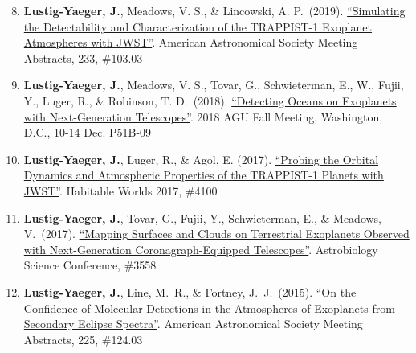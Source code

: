 \documentclass[margin,10pt]{res}
\newenvironment{benumerate}[1]{
    \let\oldItem\item
    \def\item{\addtocounter{enumi}{-2}\oldItem}
    \begin{enumerate}
    \setcounter{enumi}{#1}
    \addtocounter{enumi}{1}
}{
    \end{enumerate}
}
\begin{document}
\begin{resume}
\begin{benumerate}{7}
                    \item \textbf{Lustig-Yaeger, J.}, Meadows, V. S., \& Lincowski, A. P.\ (2019). \href{http://adsabs.harvard.edu/abs/2019AAS...23310303L}{``Simulating the Detectability and Characterization of the TRAPPIST-1 Exoplanet Atmospheres with JWST''}. American Astronomical Society Meeting Abstracts, 233, \#103.03
                    \item \textbf{Lustig-Yaeger, J.}, Meadows, V. S., Tovar, G., Schwieterman, E., W., Fujii, Y., Luger, R., \& Robinson, T. D.\ (2018). \href{https://agu.confex.com/agu/fm18/prelim.cgi/Paper/384157}{``Detecting Oceans on Exoplanets with Next-Generation Telescopes''}. 2018 AGU Fall Meeting, Washington, D.C., 10-14 Dec. P51B-09
                    \item \textbf{Lustig-Yaeger, J.}, Luger, R., \& Agol, E. (2017). \href{https://www.hou.usra.edu/meetings/habitableworlds2017/pdf/4100.pdf}{``Probing the Orbital Dynamics and Atmospheric Properties of the TRAPPIST-1 Planets with JWST''}. Habitable Worlds 2017, \#4100
                    \item \textbf{Lustig-Yaeger, J.}, Tovar, G., Fujii, Y., Schwieterman, E., \& Meadows, V.\ (2017). \href{http://www.lpi.usra.edu/meetings/abscicon2017/pdf/3558.pdf}{``Mapping Surfaces and Clouds on Terrestrial Exoplanets Observed with Next-Generation Coronagraph-Equipped Telescopes''}. Astrobiology Science Conference, \#3558
                    \item \textbf{Lustig-Yaeger, J.}, Line, M.~R., \& Fortney, J.~J.\ (2015). \href{http://adsabs.harvard.edu/abs/2015AAS...22512403L}{``On the Confidence of Molecular Detections in the Atmospheres of Exoplanets from Secondary Eclipse Spectra''}. American Astronomical Society Meeting Abstracts, 225, \#124.03\\ 
                \end{benumerate}
                

\end{resume}
\end{document}
